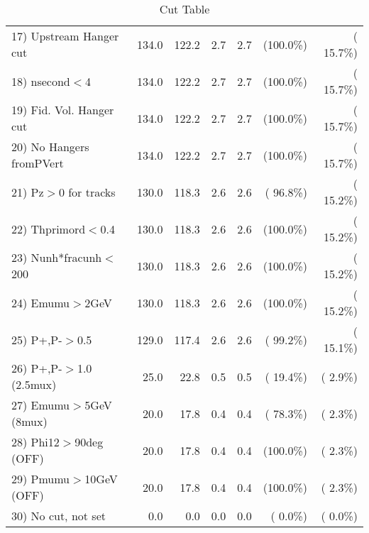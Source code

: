 \begin{table}[h!]
\begin{tabular}{||l||r|r|r|r|r|r||}
 17) Upstream Hanger cut  &        134.0 &        122.2 &          2.7 &          2.7 & (100.0\%) & ( 15.7\%) \\
 18) nsecond$<$4          &        134.0 &        122.2 &          2.7 &          2.7 & (100.0\%) & ( 15.7\%) \\
 19) Fid. Vol. Hanger cut &        134.0 &        122.2 &          2.7 &          2.7 & (100.0\%) & ( 15.7\%) \\
 20) No Hangers fromPVert &        134.0 &        122.2 &          2.7 &          2.7 & (100.0\%) & ( 15.7\%) \\
 21) Pz$>$0 for tracks    &        130.0 &        118.3 &          2.6 &          2.6 & ( 96.8\%) & ( 15.2\%) \\
 22) Thprimord$<$0.4      &        130.0 &        118.3 &          2.6 &          2.6 & (100.0\%) & ( 15.2\%) \\
 23) Nunh*fracunh$<$200   &        130.0 &        118.3 &          2.6 &          2.6 & (100.0\%) & ( 15.2\%) \\
 24) Emumu$>$2GeV         &        130.0 &        118.3 &          2.6 &          2.6 & (100.0\%) & ( 15.2\%) \\
 25) P+,P-$>$0.5          &        129.0 &        117.4 &          2.6 &          2.6 & ( 99.2\%) & ( 15.1\%) \\
 26) P+,P-$>$1.0 (2.5mux) &         25.0 &         22.8 &          0.5 &          0.5 & ( 19.4\%) & (  2.9\%) \\
 27) Emumu$>$5GeV  (8mux) &         20.0 &         17.8 &          0.4 &          0.4 & ( 78.3\%) & (  2.3\%) \\
 28) Phi12$>$90deg  (OFF) &         20.0 &         17.8 &          0.4 &          0.4 & (100.0\%) & (  2.3\%) \\
 29) Pmumu$>$10GeV  (OFF) &         20.0 &         17.8 &          0.4 &          0.4 & (100.0\%) & (  2.3\%) \\
 30) No cut, not set      &          0.0 &          0.0 &          0.0 &          0.0 & (  0.0\%) & (  0.0\%) \\
 \hline
 \hline
 \end{tabular}
 \caption{Cut Table           }
 \label{tab-cutheavy_neutrino_4.000}
 \end{table}
